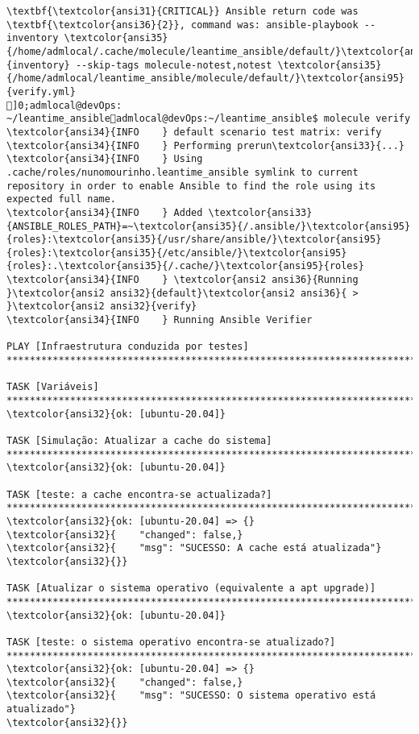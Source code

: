 \documentclass{scrartcl}
\begin{document}
\begin{Verbatim}
\textbf{\textcolor{ansi31}{CRITICAL}} Ansible return code was \textbf{\textcolor{ansi36}{2}}, command was: ansible-playbook --inventory \textcolor{ansi35}{/home/admlocal/.cache/molecule/leantime_ansible/default/}\textcolor{ansi95}{inventory} --skip-tags molecule-notest,notest \textcolor{ansi35}{/home/admlocal/leantime_ansible/molecule/default/}\textcolor{ansi95}{verify.yml}
]0;admlocal@devOps: ~/leantime_ansibleadmlocal@devOps:~/leantime_ansible$ molecule verify
\textcolor{ansi34}{INFO    } default scenario test matrix: verify
\textcolor{ansi34}{INFO    } Performing prerun\textcolor{ansi33}{...}
\textcolor{ansi34}{INFO    } Using .cache/roles/nunomourinho.leantime_ansible symlink to current repository in order to enable Ansible to find the role using its expected full name.
\textcolor{ansi34}{INFO    } Added \textcolor{ansi33}{ANSIBLE_ROLES_PATH}=~\textcolor{ansi35}{/.ansible/}\textcolor{ansi95}{roles}:\textcolor{ansi35}{/usr/share/ansible/}\textcolor{ansi95}{roles}:\textcolor{ansi35}{/etc/ansible/}\textcolor{ansi95}{roles}:.\textcolor{ansi35}{/.cache/}\textcolor{ansi95}{roles}
\textcolor{ansi34}{INFO    } \textcolor{ansi2 ansi36}{Running }\textcolor{ansi2 ansi32}{default}\textcolor{ansi2 ansi36}{ > }\textcolor{ansi2 ansi32}{verify}
\textcolor{ansi34}{INFO    } Running Ansible Verifier

PLAY [Infraestrutura conduzida por testes] ***********************************************************************************************

TASK [Variáveis] *************************************************************************************************************************
\textcolor{ansi32}{ok: [ubuntu-20.04]}

TASK [Simulação: Atualizar a cache do sistema] *******************************************************************************************
\textcolor{ansi32}{ok: [ubuntu-20.04]}

TASK [teste: a cache encontra-se actualizada?] *******************************************************************************************
\textcolor{ansi32}{ok: [ubuntu-20.04] => {}
\textcolor{ansi32}{    "changed": false,}
\textcolor{ansi32}{    "msg": "SUCESSO: A cache está atualizada"}
\textcolor{ansi32}{}}

TASK [Atualizar o sistema operativo (equivalente a apt upgrade)] *************************************************************************
\textcolor{ansi32}{ok: [ubuntu-20.04]}

TASK [teste: o sistema operativo encontra-se atualizado?] ********************************************************************************
\textcolor{ansi32}{ok: [ubuntu-20.04] => {}
\textcolor{ansi32}{    "changed": false,}
\textcolor{ansi32}{    "msg": "SUCESSO: O sistema operativo está atualizado"}
\textcolor{ansi32}{}}


\end{Verbatim}
\end{document}
